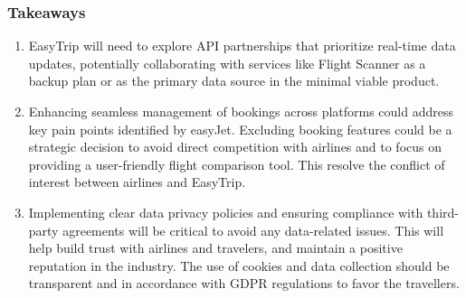 \subsubsection{Takeaways}
\begin{enumerate}
    \item EasyTrip will need to explore API partnerships that prioritize real-time data updates, potentially collaborating with services like Flight Scanner as a backup plan or as the primary data source in the minimal viable product.
    \item Enhancing seamless management of bookings across platforms could address key pain points identified by easyJet. Excluding booking features could be a strategic decision to avoid direct competition with airlines and to focus on providing a user-friendly flight comparison tool. This resolve the conflict of interest between airlines and EasyTrip.
    \item Implementing clear data privacy policies and ensuring compliance with third-party agreements will be critical to avoid any data-related issues. This will help build trust with airlines and travelers, and maintain a positive reputation in the industry. The use of cookies and data collection should be transparent and in accordance with GDPR regulations to favor the travellers.
\end{enumerate}